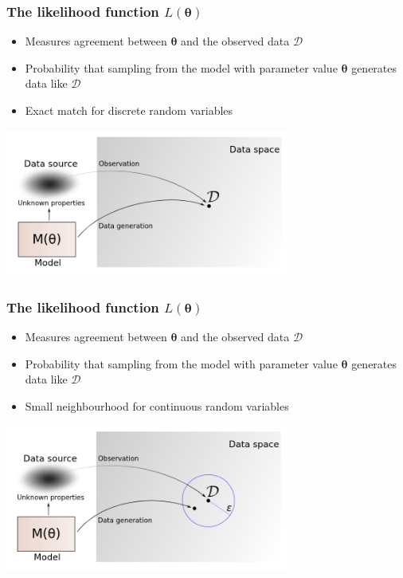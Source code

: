\documentclass{beamer}
\begin{document}
\begin{frame}
  \frametitle{The likelihood function $L(\bm{\theta})$}

  \begin{itemize}
    \item Measures agreement between $\bm{\theta}$ and the observed data $\mathcal{D}$
    \item Probability that sampling from the model with parameter value $\bm{\theta}$ generates data like $\mathcal{D}$
    \item Exact match for discrete random variables
  \end{itemize}

  \begin{center}
    \includegraphics[width=0.7\textwidth]{figures/likelihood_1.png}
  \end{center}
\end{frame}

\begin{frame}
  \frametitle{The likelihood function $L(\bm{\theta})$}

  \begin{itemize}
    \item Measures agreement between $\bm{\theta}$ and the observed data $\mathcal{D}$
    \item Probability that sampling from the model with parameter value $\bm{\theta}$ generates data like $\mathcal{D}$
    \item Small neighbourhood for continuous random variables
  \end{itemize}

  \begin{center}
    \includegraphics[width=0.7\textwidth]{figures/likelihood_2.png}
  \end{center}
\end{frame}
\end{document}
